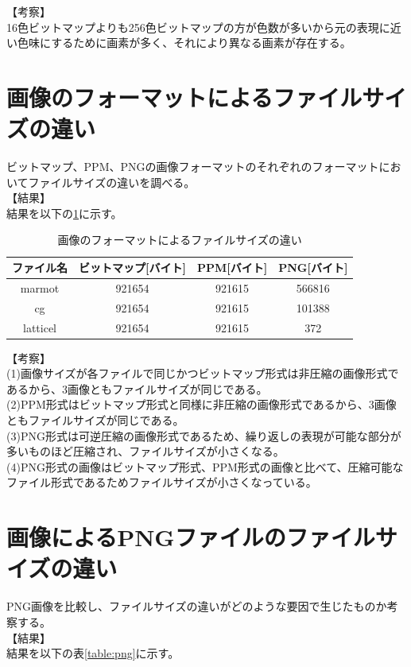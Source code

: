 \documentclass[uplatex, titlepage]{jsarticle}
\begin{document}
【考察】\\

  16色ビットマップよりも256色ビットマップの方が色数が多いから元の表現に近い色味にするために画素が多く、それにより異なる画素が存在する。\\

\section{画像のフォーマットによるファイルサイズの違い}

  ビットマップ、PPM、PNGの画像フォーマットのそれぞれのフォーマットにおいてファイルサイズの違いを調べる。\\
【結果】\\
  結果を以下の\ref{table:tigai}に示す。
\begin{table}[H]
  \centering
  \caption{画像のフォーマットによるファイルサイズの違い}
  \label{table:tigai}
  \begin{tabular}{|c|c|c|c|} \hline
    ファイル名 & ビットマップ[バイト] & PPM[バイト] & PNG[バイト] \\ \hline
    marmot & 921654 & 921615 & 566816 \\ \hline
    cg & 921654 & 921615 & 101388 \\ \hline
    latticel & 921654 & 921615 & 372 \\ \hline
  \end{tabular}
\end{table}
【考察】\\
(1)画像サイズが各ファイルで同じかつビットマップ形式は非圧縮の画像形式であるから、3画像ともファイルサイズが同じである。\\
(2)PPM形式はビットマップ形式と同様に非圧縮の画像形式であるから、3画像ともファイルサイズが同じである。\\
(3)PNG形式は可逆圧縮の画像形式であるため、繰り返しの表現が可能な部分が多いものほど圧縮され、ファイルサイズが小さくなる。\\
(4)PNG形式の画像はビットマップ形式、PPM形式の画像と比べて、圧縮可能なファイル形式であるためファイルサイズが小さくなっている。\\

\section{画像によるPNGファイルのファイルサイズの違い}

  PNG画像を比較し、ファイルサイズの違いがどのような要因で生じたものか考察する。\\
【結果】\\
  結果を以下の表\ref{table:png}に示す。\\
\end{document}
